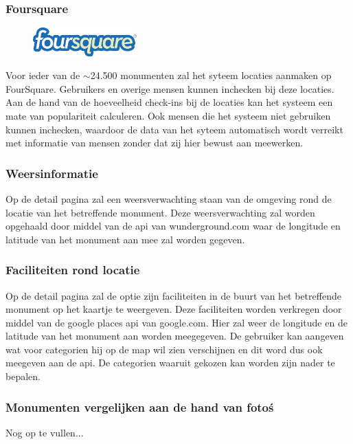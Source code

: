 \documentclass[a4paper,10pt]{article}
\begin{document}
	        		\subsubsection{Foursquare}
  			\begin{figure}
				\begin{center}
    					\includegraphics[width=4cm]{nunl-logo}
				\end{center}
			\end{figure}
			Voor ieder van de $\sim$24.500 monumenten zal het syteem locaties aanmaken op FourSquare. Gebruikers en overige mensen kunnen inchecken bij deze locaties. Aan de hand van de hoeveelheid check-ins bij de locaties kan het systeem een mate van populariteit calculeren. Ook mensen die het systeem niet gebruiken kunnen inchecken, waardoor de data van het syteem automatisch wordt verreikt met informatie van mensen zonder dat zij hier bewust aan meewerken.
				
			\subsubsection{Weersinformatie}
			Op de detail pagina zal een weersverwachting staan van de omgeving rond de locatie van het betreffende monument. Deze weersverwachting zal worden opgehaald door middel van de api van wunderground.com waar de longitude en latitude van het monument aan mee zal worden gegeven.
				
			\subsubsection{Faciliteiten rond locatie}
			Op de detail pagina zal de optie zijn faciliteiten in de buurt van het betreffende monument op het kaartje te weergeven. Deze faciliteiten worden verkregen door middel van de google places api van google.com. Hier zal weer de longitude en de latitude van het monument aan worden meegegeven. De gebruiker kan aangeven wat voor categorien hij op de map wil zien verschijnen en dit word dus ook meegeven aan de api. De categorien waaruit gekozen kan worden zijn nader te bepalen.
				
			\subsubsection{Monumenten vergelijken aan de hand van foto\'s}
			Nog op te vullen...
				
\end{document}
